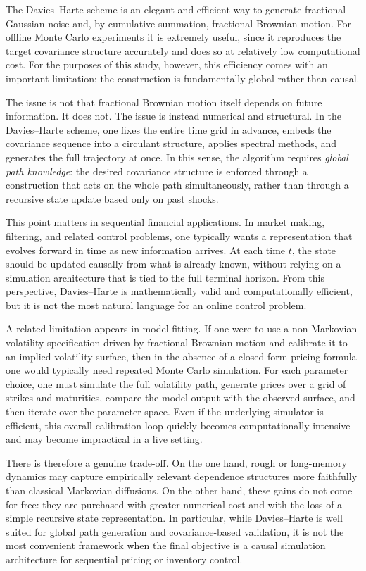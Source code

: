 The Davies--Harte scheme is an elegant and efficient way to generate fractional Gaussian noise and, by cumulative summation, fractional Brownian motion. For offline Monte Carlo experiments it is extremely useful, since it reproduces the target covariance structure accurately and does so at relatively low computational cost. For the purposes of this study, however, this efficiency comes with an important limitation: the construction is fundamentally global rather than causal.

The issue is not that fractional Brownian motion itself depends on future information. It does not. The issue is instead numerical and structural. In the Davies--Harte scheme, one fixes the entire time grid in advance, embeds the covariance sequence into a circulant structure, applies spectral methods, and generates the full trajectory at once. In this sense, the algorithm requires \emph{global path knowledge}: the desired covariance structure is enforced through a construction that acts on the whole path simultaneously, rather than through a recursive state update based only on past shocks.

This point matters in sequential financial applications. In market making, filtering, and related control problems, one typically wants a representation that evolves forward in time as new information arrives. At each time \(t\), the state should be updated causally from what is already known, without relying on a simulation architecture that is tied to the full terminal horizon. From this perspective, Davies--Harte is mathematically valid and computationally efficient, but it is not the most natural language for an online control problem.

A related limitation appears in model fitting. If one were to use a non-Markovian volatility specification driven by fractional Brownian motion and calibrate it to an implied-volatility surface, then in the absence of a closed-form pricing formula one would typically need repeated Monte Carlo simulation. For each parameter choice, one must simulate the full volatility path, generate prices over a grid of strikes and maturities, compare the model output with the observed surface, and then iterate over the parameter space. Even if the underlying simulator is efficient, this overall calibration loop quickly becomes computationally intensive and may become impractical in a live setting.

There is therefore a genuine trade-off. On the one hand, rough or long-memory dynamics may capture empirically relevant dependence structures more faithfully than classical Markovian diffusions. On the other hand, these gains do not come for free: they are purchased with greater numerical cost and with the loss of a simple recursive state representation. In particular, while Davies--Harte is well suited for global path generation and covariance-based validation, it is not the most convenient framework when the final objective is a causal simulation architecture for sequential pricing or inventory control.

